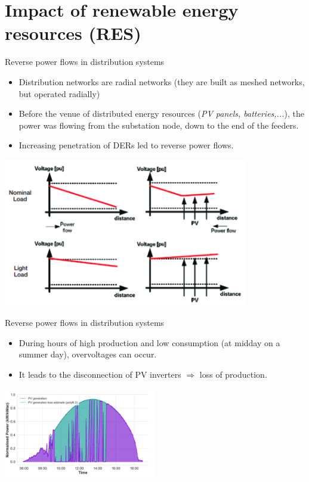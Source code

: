 \section{Impact of renewable energy resources (RES)}
\begin{frame}[allowframebreaks]{Reverse power flows in distribution systems}
\begin{itemize}
    \item Distribution networks are radial networks (they are built as meshed networks, but operated radially)
    \item Before the venue of distributed energy resources (\emph{PV panels, batteries,...}), the power was flowing from the substation node, down to the end of the feeders.
    \item Increasing penetration of DERs led to reverse power flows.
\end{itemize}
\begin{center}
\includegraphics[width=0.8\textwidth]{images/VoltageProfile.png}
\end{center}
\end{frame}

\begin{frame}{Reverse power flows in distribution systems}
\begin{itemize}
    \item During hours of high production and low consumption (at midday on a summer day), overvoltages can occur.
    \item It leads to the disconnection of PV inverters $\Rightarrow$ loss of production.
\end{itemize}
\begin{center}
\includegraphics[width=0.5\textwidth]{images/PVdisconnection.png}
\end{center}
\end{frame}

